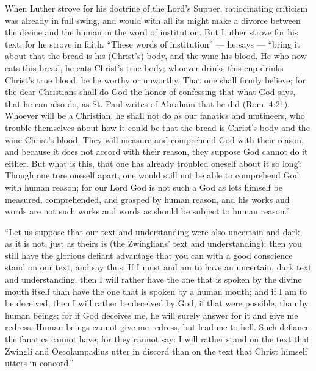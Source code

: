 \documentclass[12pt,a4paper]{book}
\begin{document}
When Luther strove for his doctrine of the Lord's Supper, ratiocinating
criticism was already in full swing, and would with all its might make a divorce
between the divine and the human in the word of institution. But Luther strove
for his text, for he strove in faith. ``These words of institution'' --- he says
--- ``bring it about that the bread is his (Christ's) body, and the wine his
blood. He who now eats this bread, he eats Christ's true body; whoever drinks
this cup drinks Christ's true blood, be he
worthy or unworthy. That one shall firmly believe; for the dear Christians shall
do God the honor of confessing that what God says, that he can also do, as St.
Paul writes of Abraham that he did (Rom. 4:21). Whoever will be a Christian, he
shall not do as our fanatics and mutineers, who trouble themselves about how it
could be that the bread is Christ's body and the wine Christ's blood. They will
measure and comprehend God with their reason, and because it does not accord
with their reason, they suppose God cannot do it either. But what is this, that
one has already troubled oneself about it so long? Though one tore oneself apart,
one would still not be able to comprehend God with human reason; for our Lord God
is not such a God as lets himself be measured, comprehended, and grasped by human
reason, and his works and words are not such works and words as should be subject
to human reason.''

``Let us suppose that our text and understanding were also uncertain and dark, as
it is not, just as theirs is (the Zwinglians' text and understanding); then you
still have the glorious defiant advantage that you can with a good conscience
stand on our text, and say thus: If I must and am to have an uncertain, dark text
and understanding, then I will rather have the one that is spoken by the divine
mouth itself than have the one that is spoken by a human mouth; and if I am to be
deceived, then I will rather be deceived by God, if that were possible, than by
human beings; for if God deceives me, he will surely answer for it and give me
redress. Human beings cannot give me redress, but lead me to hell. Such defiance
the fanatics cannot have; for they cannot say: I will rather stand on the text
that Zwingli and Oecolampadius utter in discord than on the text that Christ
himself utters in concord.''
\end{document}
